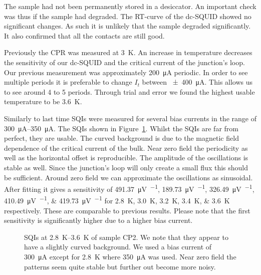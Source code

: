 The sample had not been permanently stored in a desiccator. An important check was thus if the sample had degraded. The RT-curve of the dc-SQUID showed no significant changes. As such it is unlikely that the sample degraded significantly. It also confirmed that all the contacts are still good.

Previously the CPR was measured at \qty{3}{\kelvin}. An increase in temperature decreases the sensitivity of our dc-SQUID and the critical current of the junction's loop. Our previous measurement was approximately \qty{200}{\micro\ampere} periodic. In order to see multiple periods it is preferable to change $I_t$ between \qty{\pm400}{\micro\ampere}. This allows us to see around 4 to 5 periods. Through trial and error we found the highest usable temperature to be \qty{3.6}{\kelvin}.

Similarly to last time SQIs were measured for several bias currents in the range of \qtyrange{300}{350}{\micro\ampere}. The SQIs shown in Figure~\ref{fig:CP2.6B_revisited_SQIs}. Whilst the SQIs are far from perfect, they are usable. The curved background is due to the magnetic field dependence of the critical current of the bulk. Near zero field the periodicity as well as the horizontal offset is reproducible. The amplitude of the oscillations is stable as well. Since the junction's loop will only create a small flux this should be sufficient. Around zero field we can approximate the oscillations as sinusoidal. After fitting it gives a sensitivity of \qtylist{491.37;189.73;326.49;410.49;419.73}{\micro\volt\per\fluxquantum} for \qtylist{2.8;3.0;3.2;3.4;3.6}{\kelvin} respectively. These are comparable to previous results. Please note that the first sensitivity is significantly higher due to a higher bias current.

\begin{figure}[ht!]
	\centering
	
	\caption{SQIs at \qtyrange{2.8}{3.6}{\kelvin} of sample CP2. We note that they appear to have a slightly curved background. We used a bias current of \qty{300}{\micro\ampere} except for \qty{2.8}{\kelvin} where \qty{350}{\micro\ampere} was used. Near zero field the patterns seem quite stable but further out become more noisy.}
	\label{fig:CP2.6B_revisited_SQIs}
\end{figure}

